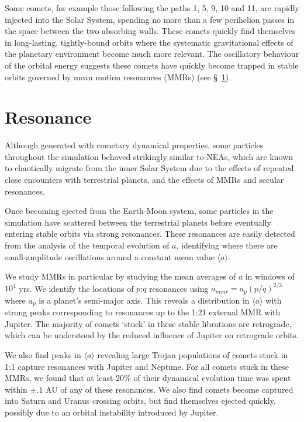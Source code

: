 Some comets, for example those following the paths 1, 5, 9, 10 and 11, are rapidly injected into the Solar System, spending no more than a few perihelion passes in the space between the two absorbing walls. These comets quickly find themselves in long-lasting, tightly-bound orbits where the systematic gravitational effects of the planetary environment become much more relevant. The oscillatory behaviour of the orbital energy suggests these comets have quickly become trapped in stable orbits governed by mean motion resonances (MMRs) (see \S~\ref{sec:resonance}).


\section{Resonance}
\label{sec:resonance}

Although generated with cometary dynamical properties, some particles throughout the simulation behaved strikingly similar to NEAs, which are known to chaotically migrate from the inner Solar System due to the effects of repeated close encounters with terrestrial planets, and the effects of MMRs and secular resonances.

Once becoming ejected from the Earth-Moon system, some particles in the simulation have scattered between the terrestrial planets before eventually entering stable orbits via strong resonances. These resonances are easily detected from the analysis of the temporal evolution of $a$, identifying where there are small-amplitude oscillations around a constant mean value $\langle a \rangle$. 

We study MMRs in particular by studying the mean averages of $a$ in windows of $10^4$ yrs. We identify the locations of $p$:$q$ resonances using $a_{mmr} = a_p (p/q)^{2/3}$ where $a_p$ is a planet's semi-major axis. This reveals a distribution in $\langle a \rangle$ with strong peaks corresponding to resonances up to the 1:21 external MMR with Jupiter. The majority of comets `stuck' in these stable librations are retrograde, which can be understood by the reduced influence of Jupiter on retrograde orbits. 

We also find peaks in $\langle a \rangle$ revealing large Trojan populations of comets stuck in 1:1 capture resonances with Jupiter and Neptune. For all comets stuck in these MMRs, we found that at least 20\% of their dynamical evolution time was spent within $\pm.1$ AU of any of these resonances. We also find comets become captured into Saturn and Uranus crossing orbits, but find themselves ejected quickly, possibly due to an orbital instability introduced by Jupiter.

